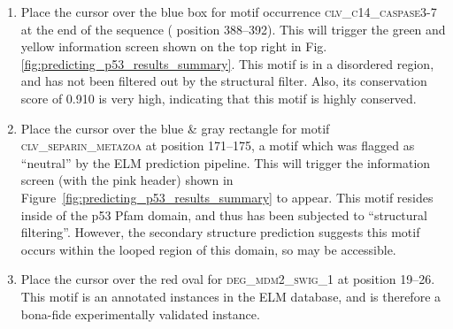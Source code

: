 \documentclass[12pt]{article}
\newcommand\motif[1]{%
    \textsc{\lowercase{#1}}%
}
\begin{document}
\begin{enumerate}

\item Place the cursor over the blue box for motif occurrence
	\motif{CLV\_C14\_Caspase3-7} at the end of the sequence (
	position 388--392). This will trigger the green and yellow
	information screen shown on the top right in Fig.
	\ref{fig:predicting_p53_results_summary}.
	This motif is in a disordered region, and has not been
	filtered out by the structural filter. Also, its conservation score
	of 0.910 is very high, indicating that this motif is highly conserved.


\item \label{sec:predicting_p53_results_structure_filter} Place the cursor over the blue \& gray rectangle for motif
	\motif{CLV\_Separin\_Metazoa} at position 171--175, a motif
	which was flagged as ``neutral'' by the ELM prediction pipeline.
	This will trigger the information screen (with the pink header) shown
	in Figure~\ref{fig:predicting_p53_results_summary} to appear.
	This motif resides inside of the p53 Pfam domain, and thus has been
	subjected to ``structural filtering''. However, the secondary structure
	prediction suggests this motif occurs within the looped region of this
	domain, so may be accessible.


\item Place the cursor over the red oval for \motif{DEG\_MDM2\_SWIG\_1} at
	position 19--26. This motif is an annotated instances in the
	ELM database, and is therefore a bona-fide experimentally validated
	instance.

	


\end{enumerate}
\end{document}
